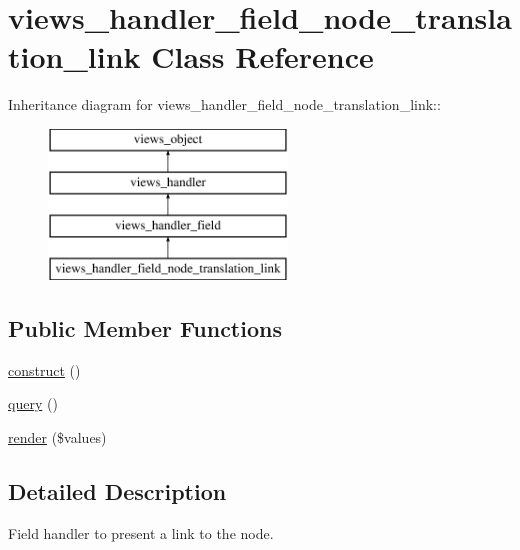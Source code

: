 \hypertarget{classviews__handler__field__node__translation__link}{
\section{views\_\-handler\_\-field\_\-node\_\-translation\_\-link Class Reference}
\label{classviews__handler__field__node__translation__link}
}
Inheritance diagram for views\_\-handler\_\-field\_\-node\_\-translation\_\-link::\begin{figure}[H]
\begin{center}
\leavevmode
\includegraphics[height=4cm]{classviews__handler__field__node__translation__link}
\end{center}
\end{figure}
\subsection*{Public Member Functions}
\begin{CompactItemize}
\item 
\hyperlink{classviews__handler__field__node__translation__link_834c20607c0a929900b7ace53425847a}{construct} ()
\item 
\hyperlink{classviews__handler__field__node__translation__link_ccd7784b851085dadf55b773f1845097}{query} ()
\item 
\hyperlink{classviews__handler__field__node__translation__link_24fd39ca3d02b69858986ee7ba580d41}{render} (\$values)
\end{CompactItemize}


\subsection{Detailed Description}
Field handler to present a link to the node. 

